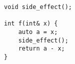 \begin{lstlisting}[title=\href{https://godbolt.org/z/dG77f4}{\texttt{godbolt.org/z/dG77f4}}]
void side_effect();

int f(int& x) {
    auto a = x;
    side_effect();
    return a - x;
}
\end{lstlisting}

